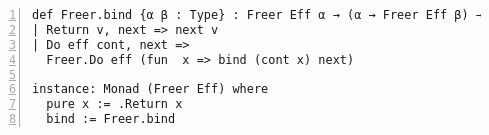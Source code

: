 \begin{lstlisting}[language=lean, numbers=left]
def Freer.bind {α β : Type} : Freer Eff α → (α → Freer Eff β) → Freer Eff β
| Return v, next => next v
| Do eff cont, next =>
  Freer.Do eff (fun  x => bind (cont x) next)

instance: Monad (Freer Eff) where
  pure x := .Return x
  bind := Freer.bind
\end{lstlisting}
    